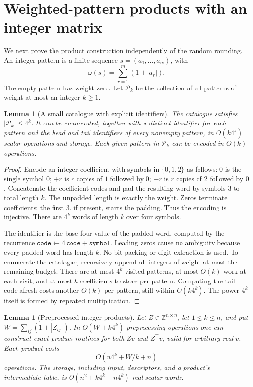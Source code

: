 \documentclass[11pt,a4paper]{article}
\newtheorem{lemma}[theorem]{Lemma}
\theoremstyle{remark}
\newcommand{\Z}{\mathbb Z}
\begin{document}
\section{Weighted-pattern products with an integer matrix}

We next prove the product construction independently of the random rounding.
An integer pattern is a finite sequence $s=(a_1,\ldots,a_m)$, with
\[
 \omega(s)=\sum_{r=1}^m(1+|a_r|).
\]
The empty pattern has weight zero. Let $\mathcal P_k$ be the collection of all
patterns of weight at most an integer $k\ge1$.

\begin{lemma}[A small catalogue with explicit identifiers]\label{lem:catalogue}
The catalogue satisfies $|\mathcal P_k|\le4^k$. It can be enumerated, together
with a distinct identifier for each pattern and the head and tail identifiers
of every nonempty pattern, in $O(k4^k)$ scalar operations and storage.
Each given pattern in $\mathcal P_k$ can be encoded in $O(k)$ operations.
\end{lemma}

\begin{proof}
Encode an integer coefficient with symbols in $\{0,1,2\}$ as follows:
$0$ is the single symbol $0$; $+r$ is $r$ copies of $1$ followed by $0$;
$-r$ is $r$ copies of $2$ followed by $0$. Concatenate the coefficient codes
and pad the resulting word by symbols $3$ to total length $k$.
The unpadded length is exactly the weight. Zeros terminate coefficients;
the first $3$, if present, starts the padding. Thus the encoding is injective.
There are $4^k$ words of length $k$ over four symbols.

The identifier is the base-four value of the padded word, computed by the
recurrence $\texttt{code}\leftarrow4\,\texttt{code}+\texttt{symbol}$.
Leading zeros cause no ambiguity because every padded word has length $k$.
No bit-packing or digit extraction is used. To enumerate the catalogue,
recursively append all integers of weight at most the remaining budget.
There are at most $4^k$ visited patterns, at most $O(k)$ work at each visit,
and at most $k$ coefficients to store per pattern. Computing the tail code
afresh costs another $O(k)$ per pattern, still within $O(k4^k)$.
The power $4^k$ itself is formed by repeated multiplication.
\end{proof}

\begin{lemma}[Preprocessed integer products]\label{lem:product}
Let $Z\in\Z^{n\times n}$, let $1\le k\le n$, and put
$W=\sum_{ij}(1+|Z_{ij}|)$. In $O(W+k4^k)$ preprocessing operations one can
construct exact product routines for both $Zv$ and $Z^\top v$, valid for
arbitrary real $v$. Each product costs
\begin{equation}\label{eq:productcost}
 O(n4^k+W/k+n)
\end{equation}
operations. The storage, including input, descriptors, and a product's
intermediate table, is $O(n^2+k4^k+n4^k)$ real-scalar words.
\end{lemma}
\end{document}
